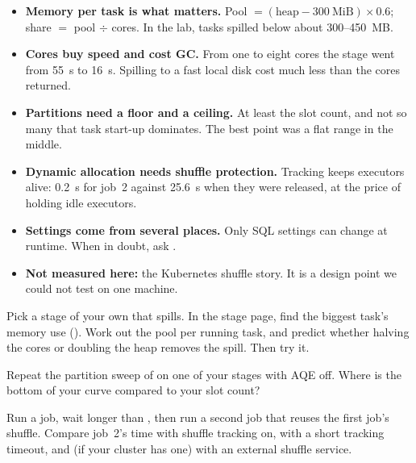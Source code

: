 \begin{itemize}
\item \textbf{Memory per task is what matters.} Pool $= (\text{heap} - 300~\text{MiB})
      \times 0.6$; share $=$ pool $\div$ cores. In the lab, tasks spilled below about
      300--450~MB.
\item \textbf{Cores buy speed and cost GC.} From one to eight cores the stage went
      from 55~s to 16~s. Spilling to a fast local disk cost much less than the cores
      returned.
\item \textbf{Partitions need a floor and a ceiling.} At least the slot count, and not
      so many that task start-up dominates. The best point was a flat range in the
      middle.
\item \textbf{Dynamic allocation needs shuffle protection.} Tracking keeps executors
      alive: 0.2~s for job~2 against 25.6~s when they were released, at the price of
      holding idle executors.
\item \textbf{Settings come from several places.} Only SQL settings can change at
      runtime. When in doubt, ask .
\item \textbf{Not measured here:} the Kubernetes shuffle story. It is a design point
      we could not test on one machine.
\end{itemize}

\exercisehead
\begin{exercises}
\item Pick a stage of your own that spills. In the stage page, find the biggest
      task's memory use (). Work out the pool per running
      task, and predict whether halving the cores or doubling the heap removes the
      spill. Then try it.
\item Repeat the partition sweep of  on one of your
      stages with AQE off. Where is the bottom of your curve compared to your slot
      count?
\item Run a job, wait longer than ,
      then run a second job that reuses the first job's shuffle. Compare job~2's
      time with shuffle tracking on, with a short tracking timeout, and (if your
      cluster has one) with an external shuffle service.
\end{exercises}
